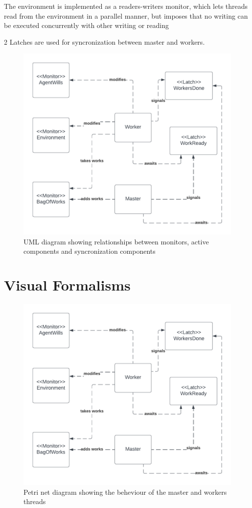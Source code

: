 \documentclass[12pt, a4paper]{report}
\begin{document}
The environment is implemented as a readers-writers monitor, which
 lets threads read from the environment in a parallel manner, but imposes
 that no writing can be executed concurrently with other writing or reading

2 Latches are used for syncronization between master and workers.

\begin{figure}
    \caption{UML diagram showing relationships between monitors, active components and syncronization components}
    \centering
    \includegraphics{UML1.png}
\end{figure}

\section{Visual Formalisms}

\begin{figure}
    \caption{Petri net diagram showing the beheviour of the master and workers threads}
    \centering
    \includegraphics{UML1.png}
\end{figure}
\end{document}
